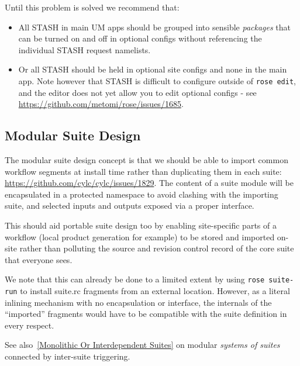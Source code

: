 Until this problem is solved we recommend that:

\begin{itemize}
  \item All STASH in main UM apps should be grouped into sensible {\em
    packages} that can be turned on and off in optional configs without
    referencing the individual STASH request namelists.
  \item Or all STASH should be held in optional site configs and none in the
    main app. Note however that STASH is difficult to configure outside of
    \lstinline=rose edit=, and the editor does not yet allow you to edit
    optional configs - see \url{https://github.com/metomi/rose/issues/1685}.
\end{itemize}

\subsection{Modular Suite Design}

The modular suite design concept is that we should be able to import common
workflow segments at install time rather than duplicating them in each suite:
\url{https://github.com/cylc/cylc/issues/1829}. The content of a suite module
will be encapsulated in a protected namespace to avoid clashing with the
importing suite, and selected inputs and outputs exposed via a proper
interface.

This should aid portable suite design too by enabling site-specific parts of a
workflow (local product generation for example) to be stored and imported
on-site rather than polluting the source and revision control record of
the core suite that everyone sees.

We note that this can already be done to a limited extent by using 
\lstinline=rose suite-run= to install suite.rc fragments from an external
location. However, as a literal inlining mechanism with no encapsulation or 
interface, the internals of the ``imported'' fragments would have to be
compatible with the suite definition in every respect.

See also~\ref{Monolithic Or Interdependent Suites} on modular {\em systems of
suites} connected by inter-suite triggering.
